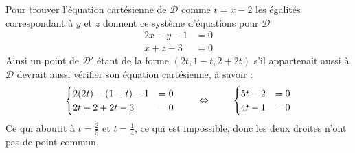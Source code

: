 \documentclass{article}
\begin{document}
Pour trouver l'équation cartésienne de $\mathcal{D}$ comme $t=x-2$ les égalités correspondant à $y$ et $z$ donnent ce système d'équations pour $\mathcal{D}$
\begin{align*}
 2x-y-1 &=0 \\
x+z-3 &=0
\end{align*}
Ainsi un point de $\mathcal{D'}$ étant de la forme $(2t,1-t,2+2t)$ s'il appartenait aussi à $\mathcal{D}$ devrait aussi vérifier son équation cartésienne, à savoir :
\[
\begin{cases}
 2(2t) - (1-t)-1 &=0 \\
2t +2+2t -3 &=0
\end{cases}
\hspace{0.8cm} \Leftrightarrow \hspace{0.8cm} 
\begin{cases}
5t-2 &=0 \\
4t -1 & =0
\end{cases}\]
Ce qui aboutit à $t=\frac{2}{5}$ et $t=\frac{1}{4}$, ce qui est impossible, donc les deux droites n'ont pas de point commun.
\end{document}
